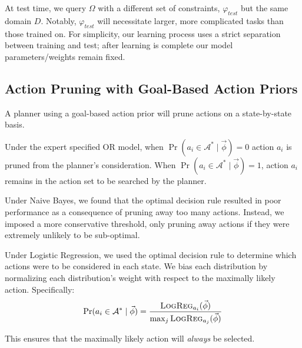 \documentclass[11pt]{article}
\begin{document}

At test time, we query $\Omega$ with a different set of constraints, $\varphi_{test}$ but the same domain $D$. Notably, $\varphi_{test}$ will necessitate larger, more complicated tasks than those trained on. For simplicity, our learning process uses a strict separation between training and test; after learning is complete our model parameters/weights remain fixed.

\subsection{Action Pruning with Goal-Based Action Priors}
\label{sec:action_pruning}
A planner using a goal-based action prior will prune actions on a state-by-state basis. 

Under the expert specified OR model, when $\Pr(a_i \in \mathcal{A}^*  \mid \vec{\phi}) = 0$
action $a_i$ is pruned from the planner's consideration. When
$\Pr(a_i \in \mathcal{A}^*  \mid \vec{\phi}) = 1$,
action $a_i$ remains in the action set to be searched by the planner.

Under Naive Bayes, we found that the optimal decision rule resulted in poor performance as a consequence of pruning away too many actions. Instead, we imposed a more conservative threshold, only pruning away actions if they were extremely unlikely to be sub-optimal.

Under Logistic Regression, we used the optimal decision rule to determine which actions were to be considered in each state. We bias each distribution by normalizing each distribution's weight with respect to the maximally likely action. Specifically:
\begin{equation}
\Pr(a_i \in \mathcal{A}^*  \mid \vec{\phi}) = \frac{\textsc{LogReg}_{a_i}( \vec{\phi})}{\max_j \textsc{LogReg}_{a_j}( \vec{\phi})}
\end{equation}

This ensures that the maximally likely action will {\it always} be selected.
\end{document}
